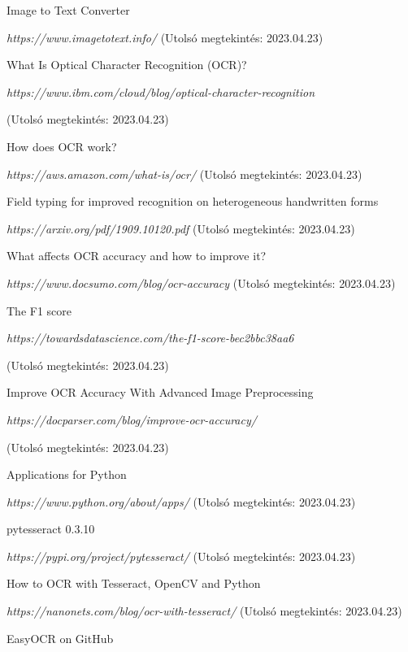 \documentclass[12pt]{report}
\begin{document}
\begin{thebibliography}{99}
\fontsize{10pt}{12pt}\selectfont

Image to Text Converter

\emph{https://www.imagetotext.info/}
(Utolsó megtekintés: 2023.04.23)


What Is Optical Character Recognition (OCR)?

\emph{https://www.ibm.com/cloud/blog/optical-character-recognition}

(Utolsó megtekintés: 2023.04.23)


How does OCR work?

\emph{https://aws.amazon.com/what-is/ocr/}
(Utolsó megtekintés: 2023.04.23)


Field typing for improved recognition on heterogeneous handwritten forms

\emph{https://arxiv.org/pdf/1909.10120.pdf}
(Utolsó megtekintés: 2023.04.23)


What affects OCR accuracy and how to improve it?

\emph{https://www.docsumo.com/blog/ocr-accuracy}
(Utolsó megtekintés: 2023.04.23)


The F1 score

\emph{https://towardsdatascience.com/the-f1-score-bec2bbc38aa6}

(Utolsó megtekintés: 2023.04.23)


Improve OCR Accuracy With Advanced Image Preprocessing

\emph{https://docparser.com/blog/improve-ocr-accuracy/}

(Utolsó megtekintés: 2023.04.23)


Applications for Python

\emph{https://www.python.org/about/apps/}
(Utolsó megtekintés: 2023.04.23)


pytesseract 0.3.10

\emph{https://pypi.org/project/pytesseract/}
(Utolsó megtekintés: 2023.04.23)


How to OCR with Tesseract, OpenCV and Python

\emph{https://nanonets.com/blog/ocr-with-tesseract/}
(Utolsó megtekintés: 2023.04.23)


EasyOCR on GitHub


\end{thebibliography}
\end{document}
